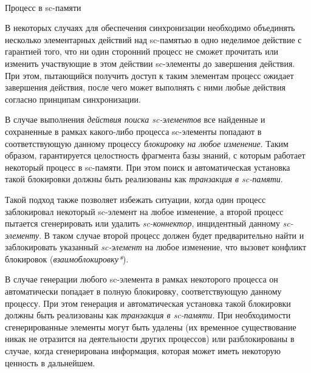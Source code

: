 \begin{frame}{\\Процесс в sc-памяти}
\topline
\vspace{30pt}

\begin{SCn}
\begin{scnindent}
\begin{scneqtoset}
\end{scneqtoset}
\end{scnindent}
\end{SCn}
\end{frame}

\begin{frame}{}
В некоторых случаях для обеспечения синхронизации необходимо объединять несколько элементарных действий над sc-памятью в одно неделимое действие с гарантией того, что ни один сторонний процесс не сможет прочитать или изменить участвующие в этом действии sc-элементы до завершения действия. При этом, пытающийся получить доступ к таким элементам процесс ожидает завершения действия, после чего может выполнять с ними любые действия согласно принципам синхронизации.

В случае выполнения \textit{действия поиска sc-элементов} все найденные и сохраненные в рамках какого-либо процесса sc-элементы попадают в соответствующую данному процессу \textit{блокировку на любое изменение}. Таким образом, гарантируется целостность фрагмента базы знаний, с которым работает некоторый процесс в sc-памяти. При этом поиск и автоматическая установка такой блокировки должны быть реализованы как \textit{транзакция в sc-памяти}.
	
\end{frame}

\begin{frame}{}
Такой подход также позволяет избежать ситуации, когда один процесс заблокировал некоторый sc-элемент на любое изменение, а второй процесс пытается сгенерировать или удалить \textit{sc-коннектор}, инцидентный данному \textit{sc-элементу}. В таком случае второй процесс должен будет предварительно найти и заблокировать указанный \textit{sc-элемент} на любое изменение, что вызовет конфликт блокировок (\textit{взаимоблокировку*}).

В случае генерации любого sc-элемента в рамках некоторого процесса он автоматически попадает в полную блокировку, соответствующую данному процессу. При этом генерация и автоматическая установка такой блокировки должны быть реализованы как \textit{транзакция в sc-памяти}. При необходимости сгенерированные элементы могут быть удалены (их временное существование никак не отразится на деятельности других процессов) или разблокированы в случае, когда сгенерирована информация, которая может иметь некоторую ценность в дальнейшем.
\end{frame}

